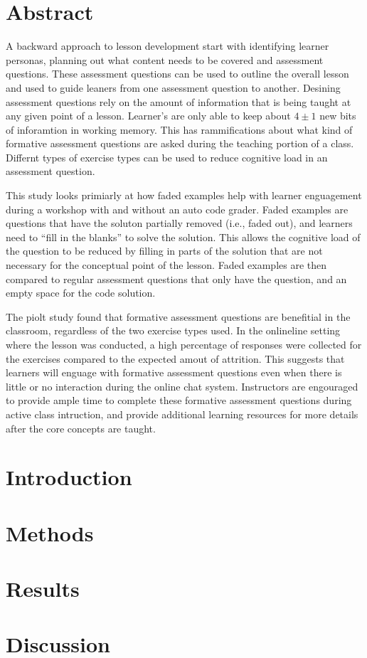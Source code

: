 \documentclass[../main.tex]{subfiles}
\begin{document}
\section*{Abstract}

A backward approach to lesson development start with identifying learner personas,
planning out what content needs to be covered and assessment questions.
These assessment questions can be used to outline the overall lesson
and used to guide leaners from one assessment question to another.
Desining assessment questions rely on the amount of information that is being taught
at any given point of a lesson.
Learner's are only able to keep about $4\pm1$ new bits of inforamtion in working memory.
This has rammifications about what kind of formative assessment questions
are asked during the teaching portion of a class.
Differnt types of exercise types can be used
to reduce cognitive load in an assessment question.

This study looks primiarly at how faded examples help with learner enguagement during a workshop
with and without an auto code grader.
Faded examples are questions that have the soluton partially removed (i.e., faded out),
and learners need to ``fill in the blanks'' to solve the solution.
This allows the cognitive load of the question to be reduced by filling in parts of the
solution that are not necessary for the conceptual point of the lesson.
Faded examples are then compared to regular assessment questions that only have the question,
and an empty space for the code solution.

The piolt study found that formative assessment questions are benefitial in the classroom,
regardless of the two exercise types used.
In the onlineline setting where the lesson was conducted,
a high percentage of responses were collected for the exercises compared to the expected amout of attrition.
This suggests that learners will enguage with formative assessment questions even when
there is little or no interaction during the online chat system.
Instructors are engouraged to provide ample time to complete these formative assessment questions
during active class intruction,
and provide additional learning resources for more details after the core concepts are taught.

\section{Introduction}

    

\section{Methods}

    

\section{Results}

    

\section{Discussion}

    
\end{document}
